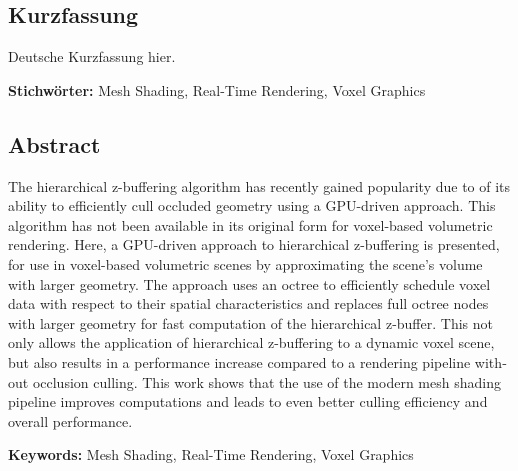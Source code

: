 \cleardoublepage

\begin{otherlanguage}{ngerman}
\chapter*{Kurzfassung}

Deutsche Kurzfassung hier.

\vfill
\noindent\textbf{Stichwörter:} Mesh Shading, Real-Time Rendering, Voxel Graphics
\vfill
\end{otherlanguage}
\begin{otherlanguage}{english}
\chapter*{Abstract}

The hierarchical z-buffering algorithm has recently gained popularity due to of its ability to 
efficiently cull occluded geometry using a GPU-driven approach. This algorithm has not been 
available in its original form for voxel-based volumetric rendering. Here, a GPU-driven 
approach to hierarchical z-buffering is presented, for use in voxel-based volumetric scenes 
by approximating the scene's volume with larger geometry. The approach uses an octree to 
efficiently schedule voxel data with respect to their spatial characteristics and replaces 
full octree nodes with larger geometry for fast computation of the hierarchical z-buffer. 
This not only allows the application of hierarchical z-buffering to a dynamic voxel scene, 
but also results in a performance increase compared to a rendering pipeline without occlusion 
culling. This work shows that the use of the modern mesh shading pipeline improves computations 
and leads to even better culling efficiency and overall performance.

\vfill
\noindent\textbf{Keywords:} Mesh Shading, Real-Time Rendering, Voxel Graphics
\vfill
\end{otherlanguage}
